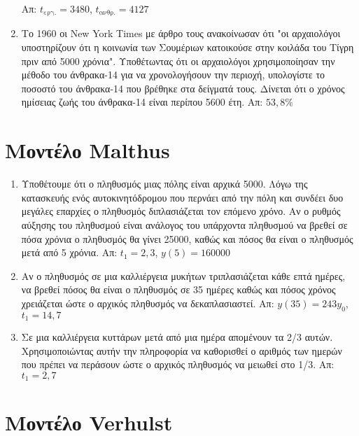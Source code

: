 \begin{enumerate}
    \hfill Απ: $ t_{\text{εργ.}} = 3480 $, $ t_{\text{ανθρ.}} = 4127 $  

  \item Το 1960 οι New York Times με άρθρο τους ανακοίνωσαν ότι "οι αρχαιολόγοι 
    υποστηρίζουν ότι η κοινωνία των Σουμέριων κατοικούσε στην κοιλάδα του Τίγρη πριν από 
    5000 χρόνια". Υποθέτωντας ότι οι αρχαιολόγοι χρησιμοποίησαν την μέθοδο του 
    άνθρακα-14 για να χρονολογήσουν την περιοχή, υπολογίστε το ποσοστό του 
    άνθρακα-14 που βρέθηκε στα δείγματά τους. Δίνεται ότι ο χρόνος ημίσειας ζωής 
    του άνθρακα-14 είναι περίπου 5600 έτη.
    \hfill Απ: $ 53,8 \% $ 
\end{enumerate}

\section*{Μοντέλο Malthus}

\begin{enumerate}
  \item Υποθέτουμε ότι ο πληθυσμός μιας πόλης είναι αρχικά 5000. Λόγω της κατασκευής 
    ενός αυτοκινητόδρομου που περνάει από την πόλη και συνδέει δυο μεγάλες επαρχίες ο
    πληθυσμός διπλασιάζεται τον επόμενο χρόνο. Αν ο ρυθμός αύξησης του πληθυσμού είναι 
    ανάλογος του υπάρχοντα πληθυσμού να βρεθεί σε πόσα χρόνια ο πληθυσμός θα γίνει 
    25000, καθώς και πόσος θα είναι ο πληθυσμός μετά από 5 χρόνια.
    \hfill Απ: $ t_{1}=2,3 $, $ y(5)=160000 $ 

  \item Αν ο πληθυσμός σε μια καλλιέργεια μυκήτων τριπλασιάζεται κάθε επτά ημέρες, να 
    βρεθεί πόσος θα είναι ο πληθυσμός σε 35 ημέρες καθώς και πόσος χρόνος χρειάζεται 
    ώστε ο αρχικός πληθυσμός να δεκαπλασιαστεί.
    \hfill Απ: $ y(35)=243 y_{0} $, $ t_{1}=14,7 $ 

  \item Σε μια καλλιέργεια κυττάρων μετά από μια ημέρα απομένουν τα 2/3 αυτών.
    Χρησιμοποιώντας αυτήν την πληροφορία να καθορισθεί ο αριθμός των ημερών που πρέπει να
    περάσουν ώστε ο αρχικός πληθυσμός να μειωθεί στο 1/3.
    \hfill Απ: $ t_{1}=2,7 $ 
\end{enumerate}


\section*{Μοντέλο Verhulst}

